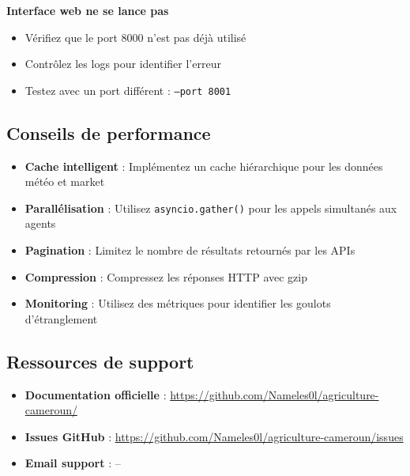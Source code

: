 \textbf{Interface web ne se lance pas}
\begin{itemize}
    \item Vérifiez que le port 8000 n'est pas déjà utilisé
    \item Contrôlez les logs pour identifier l'erreur
    \item Testez avec un port différent : \texttt{--port 8001}
\end{itemize}

\subsection{Conseils de performance}

\begin{itemize}
    \item \textbf{Cache intelligent} : Implémentez un cache hiérarchique pour les données météo et market
    \item \textbf{Parallélisation} : Utilisez \texttt{asyncio.gather()} pour les appels simultanés aux agents
    \item \textbf{Pagination} : Limitez le nombre de résultats retournés par les APIs
    \item \textbf{Compression} : Compressez les réponses HTTP avec gzip
    \item \textbf{Monitoring} : Utilisez des métriques pour identifier les goulots d'étranglement
\end{itemize}

\subsection{Ressources de support}

\begin{itemize}
    \item \textbf{Documentation officielle} : \url{https://github.com/Nameles0l/agriculture-cameroun/}
    \item \textbf{Issues GitHub} : \url{https://github.com/Nameles0l/agriculture-cameroun/issues}
    \item \textbf{Email support} : --
\end{itemize}
